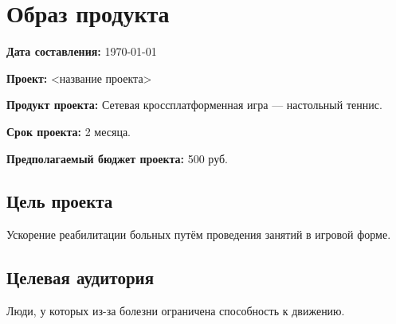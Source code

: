 \documentclass[a4paper,12pt]{article}
\begin{document}
%
%    
%
%    
%    


\section*{Образ продукта} \hfill \textbf{Дата составления:} \today

\vspace{5ex}

\noindent
\textbf{Проект: } <название проекта>

\noindent
\textbf{Продукт проекта: } Сетевая кроссплатформенная игра --- настольный теннис.

\noindent
\textbf{Срок проекта: } 2 месяца.

\noindent
\textbf{Предполагаемый бюджет проекта: } 500 руб.


\subsection*{Цель проекта}

\noindent
Ускорение реабилитации больных путём проведения занятий в игровой форме.


\subsection*{Целевая аудитория}

\noindent
Люди, у которых из-за болезни ограничена способность к движению.
\end{document}
